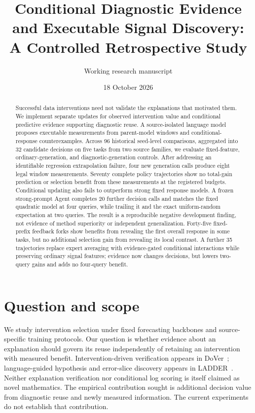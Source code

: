 \documentclass[10pt]{article}
\title{Conditional Diagnostic Evidence and Executable Signal Discovery:\\A Controlled Retrospective Study}
\author{Working research manuscript}
\date{18 October 2026}
\begin{document}
\maketitle
\begin{abstract}
Successful data interventions need not validate the explanations that motivated them.
We implement separate updates for observed intervention value and conditional predictive evidence supporting diagnostic reuse.
A source-isolated language model proposes executable measurements from parent-model windows and conditional-response counterexamples.
Across 96 historical seed-level comparisons, aggregated into 32 candidate decisions on five tasks from two source families, we evaluate fixed-feature, ordinary-generation, and diagnostic-generation controls.
After addressing an identifiable regression extrapolation failure, four new generation calls produce eight legal window measurements.
Seventy complete policy trajectories show no total-gain prediction or selection benefit from these measurements at the registered budgets.
Conditional updating also fails to outperform strong fixed response models.
A frozen strong-prompt Agent completes 20 further decision calls and matches the fixed quadratic model at four queries, while trailing it and the exact uniform-random expectation at two queries.
The result is a reproducible negative development finding, not evidence of method superiority or independent generalization.
Forty-five fixed-prefix feedback forks show benefits from revealing the first overall response in some tasks, but no additional selection gain from revealing its local contrast.
A further 35 trajectories replace expert averaging with evidence-gated conditional interactions while preserving ordinary signal features; evidence now changes decisions, but lowers two-query gains and adds no four-query benefit.
\end{abstract}

\section{Question and scope}
We study intervention selection under fixed forecasting backbones and source-specific training protocols.
Our question is whether evidence about an explanation should govern its reuse independently of retaining an intervention with measured benefit.
Intervention-driven verification appears in DoVer~\cite{dover}; language-guided hypothesis and error-slice discovery appears in LADDER~\cite{ladder}.
Neither explanation verification nor conditional log scoring is itself claimed as novel mathematics.
The empirical contribution sought is additional decision value from diagnostic reuse and newly measured information.
The current experiments do not establish that contribution.
\end{document}
